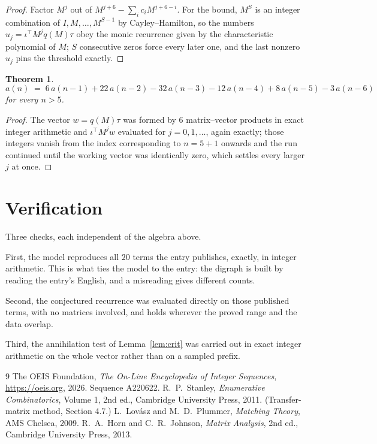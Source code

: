 \documentclass[11pt,a4paper]{article}
\theoremstyle{plain}
\newtheorem{theorem}{Theorem}
\theoremstyle{definition}
\begin{document}
\begin{proof}
Factor $M^{j}$ out of $M^{j+6}-\sum_ic_iM^{j+6-i}$. For the bound, $M^{S}$
is an integer combination of $I,M,\dots,M^{S-1}$ by Cayley--Hamilton, so the numbers
$u_j=\iota^{\!\top}M^{j}q(M)\tau$ obey the monic recurrence given by the characteristic
polynomial of $M$; $S$ consecutive zeros force every later one, and the last nonzero $u_j$
pins the threshold exactly.
\end{proof}

\begin{theorem}
\[
a(n)\;=\;6\,a(n-1) + 22\,a(n-2) - 32\,a(n-3) - 12\,a(n-4) + 8\,a(n-5) - 3\,a(n-6)
\]
for every $n>5$.
\end{theorem}

\begin{proof}
The vector $w=q(M)\tau$ was formed by $6$ matrix--vector products in exact integer
arithmetic and $\iota^{\!\top}M^{j}w$ evaluated for $j=0,1,\dots$, again exactly; those
integers vanish from the index corresponding to $n=5+1$ onwards and the run continued
until the working vector was identically zero, which settles every larger $j$ at once.
\end{proof}

\section{Verification}

Three checks, each independent of the algebra above.

First, the model reproduces all $20$ terms the entry publishes, exactly, in integer
arithmetic. This is what ties the model to the entry: the digraph is built by reading the
entry's English, and a misreading gives different counts.

Second, the conjectured recurrence was evaluated directly on those published terms, with no
matrices involved, and holds wherever the proved range and the data overlap.

Third, the annihilation test of Lemma~\ref{lem:crit} was carried out in exact integer
arithmetic on the whole vector rather than on a sampled prefix.

\begin{thebibliography}{9}
 The OEIS Foundation, \emph{The On-Line Encyclopedia of Integer
Sequences}, \url{https://oeis.org}, 2026. Sequence A220622.
 R.~P.~Stanley, \emph{Enumerative Combinatorics}, Volume 1, 2nd ed.,
Cambridge University Press, 2011. (Transfer-matrix method, Section 4.7.)
 L.~Lov\'asz and M.~D.~Plummer, \emph{Matching Theory}, AMS Chelsea,
2009.
 R.~A.~Horn and C.~R.~Johnson, \emph{Matrix Analysis}, 2nd ed., Cambridge
University Press, 2013.
\end{thebibliography}
\end{document}

